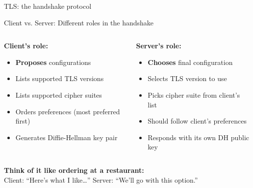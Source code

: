 \documentclass[aspectratio=169, lualatex, handout]{beamer}
\begin{document}
\begin{frame}{TLS: the handshake protocol}
\end{frame}

\begin{frame}{Client vs. Server: Different roles in the handshake}
	\begin{columns}[c]
		\begin{column}{0.5\textwidth}
			\textbf{Client's role:}
			\begin{itemize}[<+->]
				\item \textbf{Proposes} configurations
				\item Lists supported TLS versions
				\item Lists supported cipher suites
				\item Orders preferences (most preferred first)
				\item Generates Diffie-Hellman key pair
			\end{itemize}
		\end{column}
		\begin{column}{0.5\textwidth}
			\textbf{Server's role:}
			\begin{itemize}[<+->]
				\item \textbf{Chooses} final configuration
				\item Selects TLS version to use
				\item Picks cipher suite from client's list
				\item Should follow client's preferences
				\item Responds with its own DH public key
			\end{itemize}
		\end{column}
	\end{columns}
	\pause
	\begin{center}
		\textbf{Think of it like ordering at a restaurant:}\\
		Client: ``Here's what I like\ldots'' \quad Server: ``We'll go with this option.''
	\end{center}
\end{frame}
\end{document}
